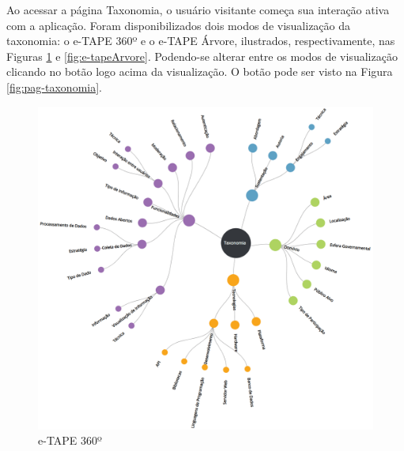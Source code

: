\par
Ao acessar a página Taxonomia, o usuário visitante começa sua interação ativa com a aplicação.
Foram disponibilizados dois modos de visualização da taxonomia: o e-TAPE 360º e o e-TAPE Árvore, ilustrados, respectivamente,
nas Figuras \ref{fig:e-tape360} e \ref{fig:e-tapeArvore}. Podendo-se alterar entre os modos de visualização clicando no botão logo acima da visualização.
O botão pode ser visto na Figura \ref{fig:pag-taxonomia}.

\vspace{1cm}

\begin{figure}[!ht]
    \centering
    \includegraphics[scale=0.20]{./figuras/taxonomia-cropped.png}
    \caption{e-TAPE 360º}
    \label{fig:e-tape360}
\end{figure}

\vspace{1cm}


